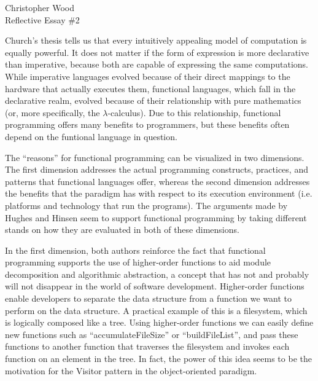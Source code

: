 \documentclass[12pt,letterpaper]{article}
\begin{document}
\begin{center}
Christopher Wood \\
Reflective Essay \#2 \\
\end{center}


Church's thesis tells us that every intuitively appealing model of computation is equally powerful. It does not 
matter if the form of expression is more declarative than imperative, because both are capable of 
expressing the same computations. While imperative languages evolved because of their direct mappings
to the hardware that actually executes them, functional languages, which fall in the declarative realm, evolved
because of their relationship with pure mathematics (or, more specifically, the $\lambda$-calculus). Due to this
relationship, functional programming offers many benefits to programmers, but these benefits often depend on the
funtional language in question.

The ``reasons'' for functional programming can be visualized in two dimensions. The first dimension addresses 
the actual programming constructs, practices, and patterns that functional languages offer, whereas the second dimension addresses the 
benefits that the paradigm has with respect to its execution environment (i.e. platforms and technology that run
the programs). The arguments made by Hughes \cite{Hughes} and Hinsen \cite{Hinsen} seem to support functional
programming by taking different stands on how they are evaluated in both of these dimensions.

In the first dimension, 
both authors reinforce the fact that functional programming supports the use of higher-order functions to aid module
decomposition and algorithmic abstraction, a concept that has not and probably will not disappear in the world of 
software development. Higher-order functions enable developers to separate the data structure from a function we want to perform on the data structure. A practical example of this is a filesystem, which is logically composed like a tree. Using higher-order functions we can easily define new functions such as ``accumulateFileSize'' or ``buildFileList'', and pass these functions to another function that traverses the filesystem and invokes each function on an element in the tree. In fact, the power of this idea seems to be the motivation for the Visitor pattern in the object-oriented paradigm. 
\end{document}
